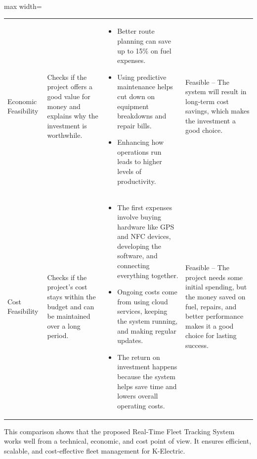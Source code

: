 \begin{table}[htbp]
\begin{adjustbox}{max width=\textwidth}
\begin{tabular}{>{\raggedright\arraybackslash}p{3.2cm} >{\raggedright\arraybackslash}p{4.2cm} >{\raggedright\arraybackslash}p{6cm} >{\raggedright\arraybackslash}p{3.4cm}}
            Economic Feasibility
            & Checks if the project offers a good value for money and explains why the investment is worthwhile.
            & \begin{itemize}[nosep, left=1em, wide=0pt]
                \item Better route planning can save up to 15\% on fuel expenses.
                \item Using predictive maintenance helps cut down on equipment breakdowns and repair bills.
                \item Enhancing how operations run leads to higher levels of productivity.
            \end{itemize}
            & Feasible – The system will result in long-term cost savings, which makes the investment a good choice. \\[8pt]
            
            Cost Feasibility
            & Checks if the project's cost stays within the budget and can be maintained over a long period.
            & \begin{itemize}[nosep, left=1em, wide=0pt]
                \item The first expenses involve buying hardware like GPS and NFC devices, developing the software, and connecting everything together.
                \item Ongoing costs come from using cloud services, keeping the system running, and making regular updates.
                \item The return on investment happens because the system helps save time and lowers overall operating costs.
            \end{itemize}
            & Feasible – The project needs some initial spending, but the money saved on fuel, repairs, and better performance makes it a good choice for lasting success. \\
            \bottomrule
        \end{tabular}
    \end{adjustbox}
\end{table}

This comparison shows that the proposed Real-Time Fleet Tracking System works well from a technical, economic, and cost point of view. It ensures efficient, scalable, and cost-effective fleet management for K-Electric.

